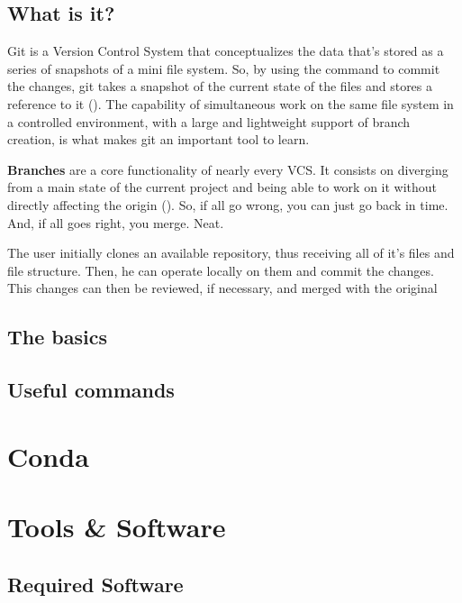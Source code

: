 \documentclass[a4paper,11pt]{article}
\begin{document}
\subsection{What is it?}
Git is a Version Control System that conceptualizes the data that's stored as
a series of snapshots of a mini file system. So, by using the command to commit
the changes, git takes a snapshot of the current state of the files and stores
a reference to it (\cite{straubProGit2025}). The capability of simultaneous work
on the same file system in a controlled environment, with a large and
lightweight support of branch creation, is what makes git an important tool to
learn.\par
\begin{definitionbox}
    \textbf{Branches} are a core functionality of nearly every VCS. It consists
    on diverging from a main state of the current project and being able to work
    on it without directly affecting the origin (\cite{straubProGit2025}).
    So, if all go wrong,
    you can just go back in time. And, if all goes right, you merge. Neat.
\end{definitionbox}
The user initially clones an available repository, thus receiving all of it's
files and file structure. Then, he can operate locally on them and commit the changes.
This changes can then be reviewed, if necessary, and merged with the original 
\subsection{The basics}
\subsection{Useful commands}

\section{Conda}

\section{}


\section{Tools \& Software}

\subsection{Required Software}
\end{document}
